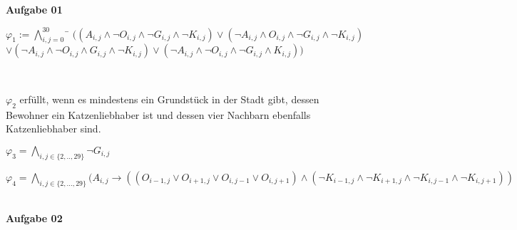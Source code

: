 \documentclass[a4paper,10pt]{article}
\begin{document}
	\parindent0pt
	\textbf{Aufgabe 01}
	\begin{compactenum} [(a)]
		\item  \begin{tabbing} $
			\varphi_1 := \bigwedge\limits_{i,j=0}^{30} $
			\= $ ((A_{i,j}\wedge \lnot O_{i,j} \wedge \lnot G_{i,j}\wedge \lnot K_{i,j})\vee(\lnot A_{i,j}\wedge O_{i,j}\wedge\lnot G_{i,j}\wedge \lnot K_{i,j}) $ \\
			\> $ \vee ( \lnot A_{i,j}\wedge \lnot O_{i,j}\wedge G_{i,j}\wedge \lnot K_{i,j})\vee( \lnot A_{i,j}\wedge \lnot O_{i,j}\wedge \lnot G_{i,j}\wedge K_{i,j}))$
		\end{tabbing}\
		\item $ \varphi_2 $ erfüllt, wenn es mindestens ein Grundstück in der Stadt gibt, dessen Bewohner ein Katzenliebhaber ist und dessen vier Nachbarn ebenfalls Katzenliebhaber sind.\\
		\item $ \varphi_3 = \bigwedge\limits_{i,j \in \{2,..,29\}} \lnot G_{i,j} $\\
		\item $ \varphi_4 = \bigwedge\limits_{i,j \in \{2,...,29\}} (A_{i,j} \rightarrow ((O_{i-1,j} \vee O_{i+1,j} \vee O_{i,j-1} \vee O_{i,j+1}) \wedge (\lnot K_{i-1,j} \wedge \lnot K_{i+1,j} \wedge \lnot K_{i,j-1} \wedge \lnot K_{i,j+1})) $
	\end{compactenum}\ \\
	\textbf{Aufgabe 02}
\end{document}
